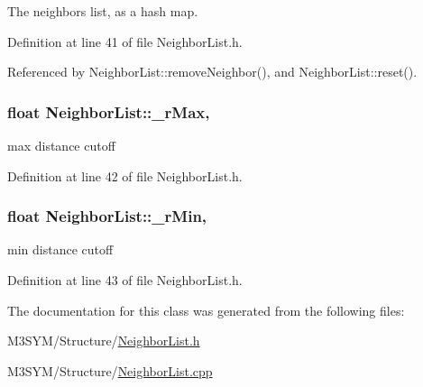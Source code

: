 The neighbors list, as a hash map. 



Definition at line 41 of file Neighbor\+List.\+h.



Referenced by Neighbor\+List\+::remove\+Neighbor(), and Neighbor\+List\+::reset().

\hypertarget{classNeighborList_a94d5215ec2f93c2191cd0ca87e062c5e}{
\subsubsection[{\+\_\+r\+Max}]{\setlength{\rightskip}{0pt plus 5cm}float Neighbor\+List\+::\+\_\+r\+Max\hspace{0.3cm}{\ttfamily [protected]}, {\ttfamily [inherited]}}}\label{classNeighborList_a94d5215ec2f93c2191cd0ca87e062c5e}


max distance cutoff 



Definition at line 42 of file Neighbor\+List.\+h.

\hypertarget{classNeighborList_a5fc2a03a950ca3867920527410ee8aa0}{
\subsubsection[{\+\_\+r\+Min}]{\setlength{\rightskip}{0pt plus 5cm}float Neighbor\+List\+::\+\_\+r\+Min\hspace{0.3cm}{\ttfamily [protected]}, {\ttfamily [inherited]}}}\label{classNeighborList_a5fc2a03a950ca3867920527410ee8aa0}


min distance cutoff 



Definition at line 43 of file Neighbor\+List.\+h.



The documentation for this class was generated from the following files\+:\begin{DoxyCompactItemize}
\item 
M3\+S\+Y\+M/\+Structure/\hyperlink{NeighborList_8h}{Neighbor\+List.\+h}\item 
M3\+S\+Y\+M/\+Structure/\hyperlink{NeighborList_8cpp}{Neighbor\+List.\+cpp}\end{DoxyCompactItemize}
